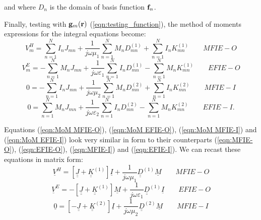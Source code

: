 and where $D_n$ is the domain of basis function $\mathbf{f}_n$.
%
\par
Finally, testing with $\mathbf{g}_m \!\left(\mathbf{r}\right)$ (\ref{eqn:testing_function}), the method of moments expressions for the integral equations become:
\begin{equation}\label{eqn:MoM MFIE-O}
\boxed{V_m^H =  \sum_{n=1}^N I_n J_{mn} + \frac{1}{j \omega \mu_1} \sum_{n=1}^{N} M_n D_{mn}^{(1)} + \sum_{n=1}^{N} I_n K_{mn}^{(1)}} \qquad MFIE-O 
\end{equation}
\begin{equation}\label{eqn:MoM EFIE-O}
\boxed{V_m^E =  - \sum_{n=1}^N M_n J_{mn} + \frac{1}{j \omega \varepsilon_1} \sum_{n=1}^{N} I_n D_{mn}^{(1)} - \sum_{n=1}^{N} M_n K_{mn}^{(1)}} \qquad EFIE-O 
\end{equation}
\begin{equation}\label{eqn:MoM MFIE-I}
\boxed{0 =  - \sum_{n=1}^N I_n J_{mn} + \frac{1}{j \omega \mu_2} \sum_{n=1}^{N} M_n D_{mn}^{(2)} + \sum_{n=1}^{N} I_n K_{mn}^{(2)}} \qquad MFIE-I
\end{equation}
\begin{equation}\label{eqn:MoM EFIE-I}
\boxed{0 =   \sum_{n=1}^N M_n J_{mn} + \frac{1}{j \omega \varepsilon_2} \sum_{n=1}^{N} I_n D_{mn}^{(2)} - \sum_{n=1}^{N} M_n K_{mn}^{(2)}} \qquad EFIE-I. 
\end{equation}
%
\par
Equations (\ref{eqn:MoM MFIE-O}), (\ref{eqn:MoM EFIE-O}), (\ref{eqn:MoM MFIE-I}) and (\ref{eqn:MoM EFIE-I}) look very similar in form to their counterparts (\ref{eqn:MFIE-O}), (\ref{eqn:EFIE-O}), (\ref{eqn:MFIE-I}) and (\ref{eqn:EFIE-I}). We can recast these equations in matrix form:
\begin{equation}\label{eqn:Matrix MFIE-O}
\boxed{\underline{V}^H =  \left[\underline{\underline{J}} + \underline{\underline{K}}^{(1)} \right] \underline{I} + \frac{1}{j \omega \mu_1}  \underline{\underline{D}}^{(1)} \underline{M} } \qquad MFIE-O 
\end{equation}
\begin{equation}\label{eqn:Matrix EFIE-O}
\boxed{\underline{V}^E =  -\left[\underline{\underline{J}} + \underline{\underline{K}}^{(1)} \right] \underline{M} + \frac{1}{j \omega \varepsilon_1}  \underline{\underline{D}}^{(1)} \underline{I} } \qquad EFIE-O 
\end{equation}
\begin{equation}\label{eqn:Matrix MFIE-I}
\boxed{\underline{0} =  \left[-\underline{\underline{J}} + \underline{\underline{K}}^{(2)} \right] \underline{I} + \frac{1}{j \omega \mu_2}  \underline{\underline{D}}^{(2)} \underline{M} } \qquad MFIE-I
\end{equation}
